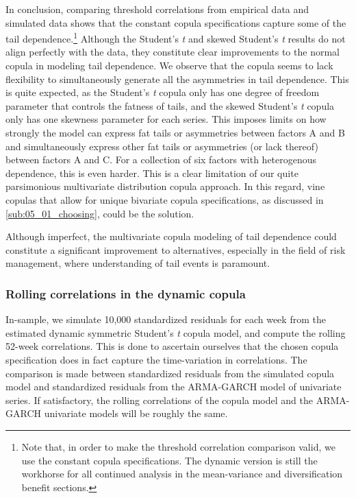 In conclusion, comparing threshold correlations from empirical data and simulated data shows that the constant copula specifications capture some of the tail dependence.\footnote{Note that, in order to make the threshold correlation comparison valid, we use the constant copula specifications. The dynamic version is still the workhorse for all continued analysis in the mean-variance and diversification benefit sections.} Although the Student's \textit{t} and skewed Student's \textit{t} results do not align perfectly with the data, they constitute clear improvements to the normal copula in modeling tail dependence. We observe that the copula seems to lack flexibility to simultaneously generate all the asymmetries in tail dependence. This is quite expected, as the Student's \textit{t} copula only has one degree of freedom parameter that controls the fatness of tails, and the skewed Student's \textit{t} copula only has one skewness parameter for each series. This imposes limits on how strongly the model can express fat tails or asymmetries between factors A and B and simultaneously express other fat tails or asymmetries (or lack thereof) between factors A and C. For a collection of six factors with heterogenous dependence, this is even harder. This is a clear limitation of our quite parsimonious multivariate distribution copula approach. In this regard, vine copulas that allow for unique bivariate copula specifications, as discussed in \autoref{sub:05_01_choosing}, could be the solution.

Although imperfect, the multivariate copula modeling of tail dependence could constitute a significant improvement to alternatives, especially in the field of risk management, where understanding of tail events is paramount.

\subsubsection{Rolling correlations in the dynamic copula}

In-sample, we simulate 10,000 standardized residuals for each week from the estimated dynamic symmetric Student's \textit{t} copula model, and compute the rolling 52-week correlations. This is done to ascertain ourselves that the chosen copula specification does in fact capture the time-variation in correlations. The comparison is made between standardized residuals from the simulated copula model and standardized residuals from the ARMA-GARCH model of univariate series. If satisfactory, the rolling correlations of the copula model and the ARMA-GARCH univariate models will be roughly the same.

